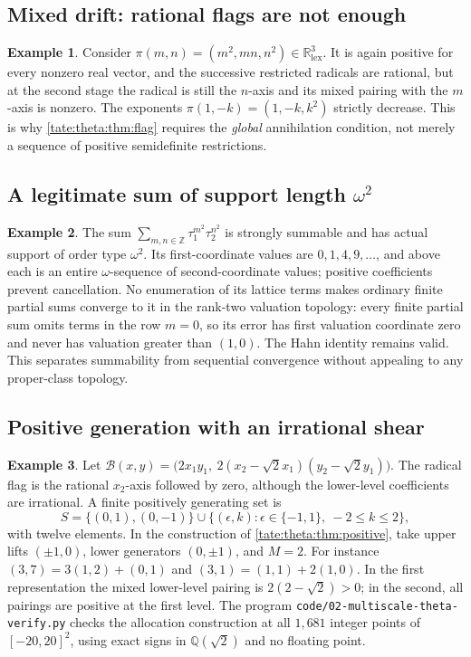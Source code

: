 \documentclass[11pt,letterpaper]{article}
\theoremstyle{definition}
\newtheorem{example}[example]{Example}
\newcommand{\R}{\mathbb R}
\newcommand{\Q}{\mathbb Q}
\newcommand{\Z}{\mathbb Z}
\newcommand{\file}[1]{\nolinkurl{#1}}
\newcommand{\lex}{\mathrm{lex}}
\newcommand{\cB}{\mathcal B}
\begin{document}
\subsection{Mixed drift: rational flags are not enough}

\begin{example}\label{tate:theta:ex:cross}
Consider $\pi(m,n)=(m^2,mn,n^2)\in\R^3_{\lex}$. It is again positive for
every nonzero real vector, and the successive restricted radicals are
rational, but at the second stage the radical is still the $n$-axis and its
mixed pairing with the $m$-axis is nonzero. The exponents
$\pi(1,-k)=(1,-k,k^2)$ strictly decrease. This is why
\cref{tate:theta:thm:flag} requires the \emph{global} annihilation
condition, not merely a sequence of positive semidefinite restrictions.
\end{example}

\subsection{A legitimate sum of support length \texorpdfstring{$\omega^2$}{omega squared}}

\begin{example}\label{tate:theta:ex:omega2}
The sum $\sum_{m,n\in\Z}\tau_1^{m^2}\tau_2^{n^2}$ is strongly summable and
has actual support of order type $\omega^2$. Its first-coordinate values are
$0,1,4,9,\ldots$, and above each is an entire $\omega$-sequence of
second-coordinate values; positive coefficients prevent cancellation. No
enumeration of its lattice terms makes ordinary finite partial sums
converge to it in the rank-two valuation topology: every finite partial sum
omits terms in the row $m=0$, so its error has first valuation coordinate
zero and never has valuation greater than $(1,0)$. The Hahn identity
remains valid. This separates summability from sequential convergence
without appealing to any proper-class topology.
\end{example}

\subsection{Positive generation with an irrational shear}

\begin{example}\label{tate:theta:ex:shear}
Let $\cB(x,y)=\bigl(2x_1y_1,\ 2(x_2-\sqrt2x_1)(y_2-\sqrt2y_1)\bigr)$. The
radical flag is the rational $x_2$-axis followed by zero, although the
lower-level coefficients are irrational. A finite positively generating set
is
\[
 S=\{(0,1),(0,-1)\}\cup\{(\epsilon,k):\epsilon\in\{-1,1\},\ -2\le k\le2\},
\]
with twelve elements. In the construction of
\cref{tate:theta:thm:positive}, take upper lifts $(\pm1,0)$, lower
generators $(0,\pm1)$, and $M=2$. For instance $(3,7)=3(1,2)+(0,1)$ and
$(3,1)=(1,1)+2(1,0)$. In the first representation the mixed lower-level
pairing is $2(2-\sqrt2)>0$; in the second, all pairings are positive at the
first level. The program \file{code/02-multiscale-theta-verify.py}
checks the allocation construction at all $1{,}681$ integer points of
$[-20,20]^2$, using exact signs in $\Q(\sqrt2)$ and no floating point.
\end{example}
\end{document}
